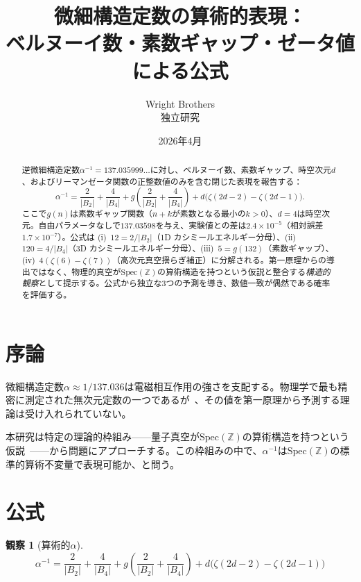 \documentclass[11pt,a4paper]{article}
\newtheorem{observation}[theorem]{観察}
\newcommand{\Spec}{\mathrm{Spec}}
\begin{document}
\title{微細構造定数の算術的表現：\\ベルヌーイ数・素数ギャップ・ゼータ値による公式}
\author{Wright Brothers\\{\small 独立研究}}
\date{2026年4月}
\maketitle

\begin{abstract}
逆微細構造定数$\alpha^{-1} = 137.035999\ldots$に対し、ベルヌーイ数、素数ギャップ、時空次元$d$、およびリーマンゼータ関数の正整数値のみを含む閉じた表現を報告する：
$$\alpha^{-1} = \frac{2}{|B_2|} + \frac{4}{|B_4|} + g\!\left(\frac{2}{|B_2|} + \frac{4}{|B_4|}\right) + d\bigl(\zeta(2d{-}2) - \zeta(2d{-}1)\bigr).$$
ここで$g(n)$は素数ギャップ関数（$n+k$が素数となる最小の$k > 0$）、$d = 4$は時空次元。自由パラメータなしで$137.03598$を与え、実験値との差は$2.4 \times 10^{-5}$（相対誤差$1.7 \times 10^{-7}$）。公式は (i)~$12 = 2/|B_2|$（1D カシミールエネルギー分母）、(ii)~$120 = 4/|B_4|$（3D カシミールエネルギー分母）、(iii)~$5 = g(132)$（素数ギャップ）、(iv)~$4(\zeta(6)-\zeta(7))$（高次元真空揺らぎ補正）に分解される。第一原理からの導出ではなく、物理的真空が$\Spec(\mathbb{Z})$の算術構造を持つという仮説と整合する\emph{構造的観察}として提示する。公式から独立な3つの予測を導き、数値一致が偶然である確率を評価する。
\end{abstract}

\section{序論}

微細構造定数$\alpha \approx 1/137.036$は電磁相互作用の強さを支配する。物理学で最も精密に測定された無次元定数の一つであるが~\cite{Mohr2016}、その値を第一原理から予測する理論は受け入れられていない。

本研究は特定の理論的枠組み——量子真空が$\Spec(\mathbb{Z})$の算術構造を持つという仮説~\cite{paper_A,paper_F}——から問題にアプローチする。この枠組みの中で、$\alpha^{-1}$は$\Spec(\mathbb{Z})$の標準的算術不変量で表現可能か、と問う。

\section{公式}

\begin{observation}[算術的$\alpha$]
\label{obs:alpha}
\begin{equation}
  \alpha^{-1} = \frac{2}{|B_2|} + \frac{4}{|B_4|} + g\!\left(\frac{2}{|B_2|} + \frac{4}{|B_4|}\right) + d\bigl(\zeta(2d{-}2) - \zeta(2d{-}1)\bigr)
  \label{eq:master}
\end{equation}
\end{observation}
\end{document}
